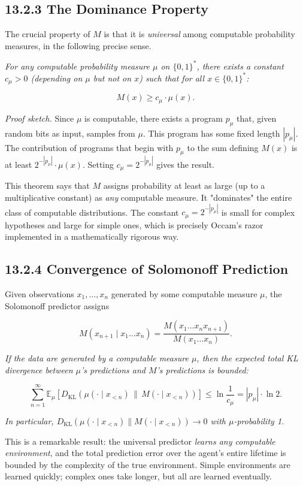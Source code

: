 \subsection{13.2.3 The Dominance Property}

The crucial property of $M$ is that it is \textit{universal} among computable probability measures, in the following precise sense.

\begin{theorem}
\textit{For any computable probability measure $\mu$ on $\{ 0,1\}^*$, there exists a constant $c_\mu > 0$ (depending on $\mu$ but not on $x$) such that for all $x \in \{ 0,1\}^*$:}

\[M(x) \geq c_\mu \cdot \mu(x).\]

\textit{Proof sketch.} Since $\mu$ is computable, there exists a program $p_\mu$ that, given random bits as input, samples from $\mu$. This program has some fixed length $|p_\mu|$. The contribution of programs that begin with $p_\mu$ to the sum defining $M(x)$ is at least $2^{-|p_\mu|} \cdot \mu(x)$. Setting $c_\mu = 2^{-|p_\mu|}$ gives the result. 

This theorem says that $M$ assigns probability at least as large (up to a multiplicative constant) as \textit{any} computable measure. It "dominates" the entire class of computable distributions. The constant $c_\mu = 2^{-|p_\mu|}$ is small for complex hypotheses and large for simple ones, which is precisely Occam's razor implemented in a mathematically rigorous way.

\end{theorem}


\subsection{13.2.4 Convergence of Solomonoff Prediction}

Given observations $x_1, \ldots, x_n$ generated by some computable measure $\mu$, the Solomonoff predictor assigns

\[M(x_{n+1} \mid x_1 \ldots x_n) = \frac{M(x_1 \ldots x_n x_{n+1})}{M(x_1 \ldots x_n)}.\]

\begin{theorem}
\textit{If the data are generated by a computable measure $\mu$, then the expected total KL divergence between $\mu$'s predictions and $M$'s predictions is bounded:}

\[\sum_{n=1}^{\infty} \mathbb{E}_\mu \left[ D_{\mathrm{KL}}\!\left(\mu(\cdot \mid x_{<n}) \,\|\, M(\cdot \mid x_{<n})\right) \right] \leq \ln \frac{1}{c_\mu} = |p_\mu| \cdot \ln 2.\]

\textit{In particular, $D_{\mathrm{KL}}(\mu(\cdot \mid x_{<n}) \| M(\cdot \mid x_{<n})) \to 0$ with $\mu$-probability 1.}

This is a remarkable result: the universal predictor \textit{learns any computable environment}, and the total prediction error over the agent's entire lifetime is bounded by the complexity of the true environment. Simple environments are learned quickly; complex ones take longer, but all are learned eventually.
\end{theorem}

